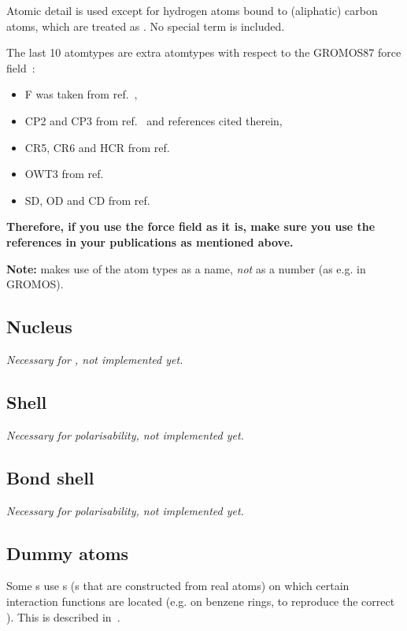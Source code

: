 Atomic detail is used except for hydrogen atoms bound to (aliphatic)
carbon atoms, which are treated as {\em {}}. No
special  term is included.

The last 10 atomtypes are extra atomtypes with respect to the GROMOS87
force field~\cite{biomos}: 
\begin{itemize}
\item F was taken from ref.~\cite{Buuren93a}, 
\item CP2 and CP3 from ref.~\cite{Buuren93b} and references cited therein, 
\item CR5, CR6 and HCR from ref.~\cite{King93}
\item OWT3 from ref.~\cite{Jorgensen83}
\item SD, OD and CD from ref.~\cite{Liu95}
\end{itemize}
{\bf Therefore, if you use the {\gromacs} force field as it is, make
sure you use the references in your publications as mentioned above.}

{\bf Note:} {\gromacs} makes use of the atom types as a name, {\em
not} as a number (as e.g. in GROMOS).

\subsection{Nucleus}
{\em Necessary for , not implemented yet.}

\subsection{Shell}
{\em Necessary for polarisability, not implemented yet.}

\subsection{Bond shell}
{\em Necessary for polarisability, not implemented yet.}

\subsection{Dummy atoms}
\label{sec:dummytop}
Some s use s 
(s that are constructed
from real atoms) on which certain interaction functions are located
(e.g. on benzene rings, to reproduce the correct
). This is described in~.

